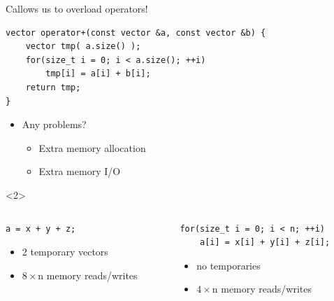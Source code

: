 \documentclass[@BEAMER_OPTIONS@]{beamer}
\newcommand{\CXX}{{\rm C}\plusplus}
\begin{document}
\note{ }

\begin{frame}[fragile]{\CXX allows us to overload operators!}
    \begin{exampleblock}{}
        \begin{lstlisting}
vector operator+(const vector &a, const vector &b) {
    vector tmp( a.size() );
    for(size_t i = 0; i < a.size(); ++i)
        tmp[i] = a[i] + b[i];
    return tmp;
}
        \end{lstlisting}
    \end{exampleblock}
    \begin{itemize}
        \item Any problems?
            \begin{itemize}
                \item<2> Extra memory allocation
                \item<2> Extra memory I/O
            \end{itemize}
    \end{itemize}
    \begin{uncoverenv}<2>
        \begin{columns}
            \begin{column}{0.45\textwidth}
                \begin{exampleblock}{}
                    \begin{lstlisting}[aboveskip=0.4\baselineskip,belowskip=0.4\baselineskip]
a = x + y + z;

                    \end{lstlisting}
                \end{exampleblock}
                \begin{itemize}
                    \item 2 temporary vectors
                    \item $8 \times \text{n}$ memory reads/writes
                \end{itemize}
            \end{column}
            \begin{column}{0.45\textwidth}
                \begin{exampleblock}{}
                    \begin{lstlisting}
for(size_t i = 0; i < n; ++i)
    a[i] = x[i] + y[i] + z[i];
                    \end{lstlisting}
                \end{exampleblock}
                \begin{itemize}
                    \item no temporaries
                    \item $4 \times \text{n}$ memory reads/writes
                \end{itemize}
            \end{column}
        \end{columns}
    \end{uncoverenv}
\end{frame}
\end{document}
